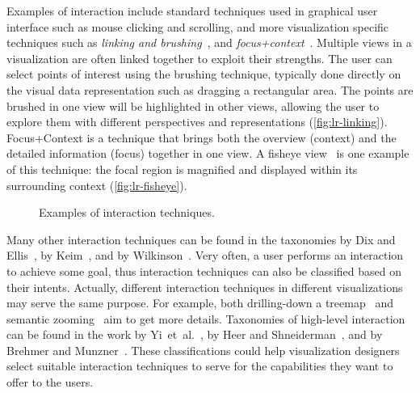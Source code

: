 Examples of interaction include standard techniques used in graphical user interface such as mouse clicking and scrolling, and more visualization specific techniques such as \emph{linking and brushing}~\cite{Kosara2003}, and \emph{focus+context}~\cite{Cockburn2008}. Multiple views in a visualization are often linked together to exploit their strengths. The user can select points of interest using the brushing technique, typically done directly on the visual data representation such as dragging a rectangular area. The points are brushed in one view will be highlighted in other views, allowing the user to explore them with different perspectives and representations (\autoref{fig:lr-linking}). Focus+Context is a technique that brings both the overview (context) and the detailed information (focus) together in one view. A fisheye view~\cite{Furnas1986,Furnas2006} is one example of this technique: the focal region is magnified and displayed within its surrounding context (\autoref{fig:lr-fisheye}).

\begin{figure}[!htb]
\centering
{} 
\hfill
{} 
\caption{Examples of interaction techniques.}
\label{fig:lr-interaction}
\end{figure}

Many other interaction techniques can be found in the taxonomies by Dix and Ellis~\cite{Dix1998}, by Keim~\cite{Keim2002}, and by Wilkinson~\cite{Wilkinson2005}. Very often, a user performs an interaction to achieve some goal, thus interaction techniques can also be classified based on their intents. Actually, different interaction techniques in different visualizations may serve the same purpose. For example, both drilling-down a treemap~\cite{Shneiderman1992} and semantic zooming~\cite{Perlin1993} aim to get more details. Taxonomies of high-level interaction can be found in the work by Yi~et~al.~\cite{Yi2007}, by Heer and Shneiderman~\cite{Heer2012}, and by Brehmer and Munzner~\cite{Brehmer2013}. These classifications could help visualization designers select suitable interaction techniques to serve for the capabilities they want to offer to the users.

